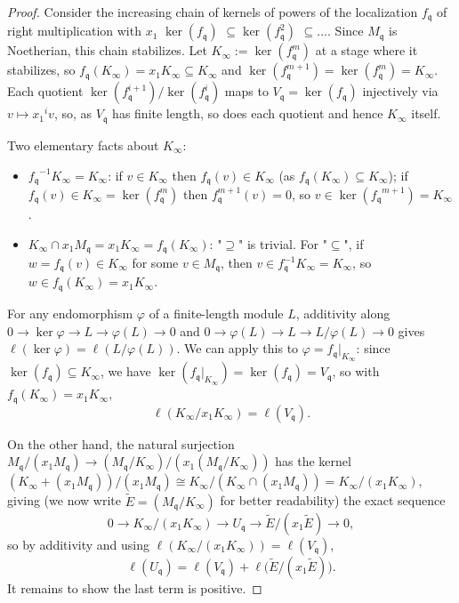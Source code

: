 \documentclass[pdflatex,sn-mathphys-num]{sn-jnl}
\numberwithin{equation}{section}
\theoremstyle{thmstyleone}
\theoremstyle{thmstyletwo}
\begin{document}
\begin{proof}
Consider the increasing chain of kernels of powers of the localization $f_{\mathfrak q}$ of right multiplication with $x_1$
$\operatorname{ker}(f_{\mathfrak q})$ $\subseteq \operatorname{ker}(f^2_{\mathfrak q})$ $\subseteq \dots$.
Since $M_{\mathfrak q}$ is Noetherian, this chain stabilizes. Let
$K_{\infty}:=\ker(f^m_{\mathfrak q})$ at a stage where it stabilizes, so $f_{\mathfrak q}(K_{\infty}) = {x_1}K_{\infty}\subseteq K_{\infty}$ and
$\ker(f^{m+1}_{\mathfrak q})=\ker(f_{\mathfrak q}^m)=K_{\infty}$. Each quotient $\ker(f_{\mathfrak q}^{i+1})/\ker(f_{\mathfrak q}^i)$ maps to
$V_{\mathfrak q}=\ker(f_{\mathfrak q})$ injectively via $v\mapsto {x_1}^iv$, so, as $V_{\mathfrak q}$ has
finite length, so does each quotient and hence $K_{\infty}$ itself.

Two elementary facts about $K_{\infty}$:
\begin{itemize}
\item ${f_{\mathfrak q}}^{-1}K_{\infty}=K_{\infty}$: if $v\in K_{\infty}$ then $f_{\mathfrak q}(v)\in K_{\infty}$ (as $f_{\mathfrak q}(K_{\infty})\subseteq K_{\infty}$); if $f_{\mathfrak q}(v)\in K_{\infty}=\ker(f_{\mathfrak q}^m)$
then $f_{\mathfrak q}^{m+1}(v)=0$, so $v\in\ker({f_{\mathfrak q}}^{m+1})=K_{\infty}$.
\item $K_{\infty}\cap {x_1}M_{\mathfrak q}={x_1}K_{\infty} = f_{\mathfrak q}(K_{\infty})$: "$\supseteq$" is trivial. For "$\subseteq$", if $w=f_{\mathfrak q}(v)\in K_{\infty}$ for
some $v\in M_{\mathfrak q}$, then $v\in f_{\mathfrak q}^{-1}K_{\infty}=K_{\infty}$, so $w\in f_{\mathfrak q}(K_{\infty}) = x_1K_{\infty}$.
\end{itemize}

For any endomorphism $\varphi$ of a finite-length module $L$,
additivity along $0\to\ker \varphi\to L\to \varphi(L)\to0$ and $0\to \varphi(L)\to L\to L/\varphi(L)\to0$ gives
$\ell(\ker \varphi)=\ell(L/\varphi(L))$. We can apply this to $\varphi=f_{\mathfrak q}|_{K_{\infty}}$: since $\ker(f_{\mathfrak q})\subseteq K_{\infty}$, we
have $\ker(f_{\mathfrak q}|_{K_{\infty}})=\ker(f_{\mathfrak q})=V_{\mathfrak q}$, so with $f_{\mathfrak q}(K_{\infty}) = x_1K_{\infty},$
\[\ell(K_{\infty}/{x_1}K_{\infty})=\ell(V_{\mathfrak q}).\]

On the other hand, the natural surjection $M_{\mathfrak q}/({x_1}M_{\mathfrak q})\to (M_{\mathfrak q}/K_{\infty})/({x_1}(M_{\mathfrak q}/K_{\infty}))$ has
the kernel $(K_{\infty}+({x_1}M_{\mathfrak q}))/({x_1}M_{\mathfrak q})\cong K_{\infty}/(K_{\infty}\cap ({x_1}M_{\mathfrak q}))=K_{\infty}/({x_1}K_{\infty})$, giving (we now write $\tilde E = (M_{\mathfrak q}/K_{\infty})$ for better readability) the exact sequence
\[0\longrightarrow K_{\infty}/({x_1}K_{\infty})\longrightarrow U_{\mathfrak q}\longrightarrow
 \tilde E/({x_1}\tilde E)\longrightarrow0,\]
so by additivity and using $\ell(K_{\infty}/({x_1}K_{\infty}))=\ell(V_{\mathfrak q})$,
\[\ell(U_{\mathfrak q}) = \ell(V_{\mathfrak q}) + \ell\bigl(\tilde E/({x_1}\tilde E)\bigr).\]
It remains to show the last term is positive.


\end{proof}
\end{document}
